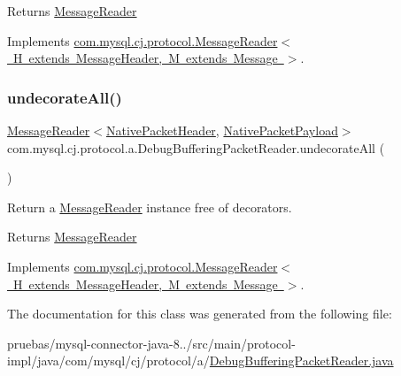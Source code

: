 \begin{DoxyReturn}{Returns}
\mbox{\hyperlink{interfacecom_1_1mysql_1_1cj_1_1protocol_1_1_message_reader}{Message\+Reader}} 
\end{DoxyReturn}


Implements \mbox{\hyperlink{interfacecom_1_1mysql_1_1cj_1_1protocol_1_1_message_reader_a59b0e118857c167ad4a270845f19e89b}{com.\+mysql.\+cj.\+protocol.\+Message\+Reader$<$ H extends Message\+Header, M extends Message $>$}}.

\mbox{\label{classcom_1_1mysql_1_1cj_1_1protocol_1_1a_1_1_debug_buffering_packet_reader_ae6337b7785d1c8adb1b4784387c2f959}} 
\subsubsection{\texorpdfstring{undecorate\+All()}{undecorateAll()}}
{\footnotesize\ttfamily \mbox{\hyperlink{interfacecom_1_1mysql_1_1cj_1_1protocol_1_1_message_reader}{Message\+Reader}}$<$\mbox{\hyperlink{classcom_1_1mysql_1_1cj_1_1protocol_1_1a_1_1_native_packet_header}{Native\+Packet\+Header}}, \mbox{\hyperlink{classcom_1_1mysql_1_1cj_1_1protocol_1_1a_1_1_native_packet_payload}{Native\+Packet\+Payload}}$>$ com.\+mysql.\+cj.\+protocol.\+a.\+Debug\+Buffering\+Packet\+Reader.\+undecorate\+All (\begin{DoxyParamCaption}{ }\end{DoxyParamCaption})}

Return a \mbox{\hyperlink{interfacecom_1_1mysql_1_1cj_1_1protocol_1_1_message_reader}{Message\+Reader}} instance free of decorators.

\begin{DoxyReturn}{Returns}
\mbox{\hyperlink{interfacecom_1_1mysql_1_1cj_1_1protocol_1_1_message_reader}{Message\+Reader}} 
\end{DoxyReturn}


Implements \mbox{\hyperlink{interfacecom_1_1mysql_1_1cj_1_1protocol_1_1_message_reader_a22a326215a91e4d7bff08d1f2c3e1b6d}{com.\+mysql.\+cj.\+protocol.\+Message\+Reader$<$ H extends Message\+Header, M extends Message $>$}}.



The documentation for this class was generated from the following file\+:\begin{DoxyCompactItemize}
\item 
pruebas/mysql-\/connector-\/java-\/8../src/main/protocol-\/impl/java/com/mysql/cj/protocol/a/\mbox{\hyperlink{_debug_buffering_packet_reader_8java}{Debug\+Buffering\+Packet\+Reader.\+java}}\end{DoxyCompactItemize}
